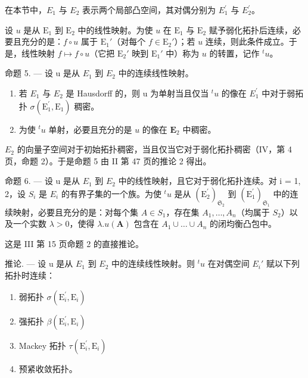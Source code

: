 在本节中，\(E_{1}\) 与 \(E_{2}\) 表示两个局部凸空间，其对偶分别为 \(E_{1}^{\prime}\) 与 \(E_{2}^{\prime}\)。

设 \(u\) 是从 \(\mathrm{E}_1\) 到 \(\mathrm{E}_2\) 中的线性映射。为使 \(u\) 在 \(\mathrm{E}_1\) 与 \(\mathrm{E}_2\) 赋予弱化拓扑后连续，必要且充分的是：\(f \circ u\) 属于 \(\mathrm{E}_1'\)（对每个 \(f \in \mathrm{E}_2'\)）；若 \(u\) 连续，则此条件成立。于是，线性映射 \(f \mapsto f \circ u\)（它把 \(\mathrm{E}_2'\) 映到 \(\mathrm{E}_1'\) 中）称为 \(u\) 的转置，记作 \(^t u\)。

命题 5. --- 设 u 是从 \(E_{1}\) 到 \(E_{2}\) 中的连续线性映射。

\begin{enumerate}
\def\labelenumi{(\roman{enumi})}
\item
  若 \(E_{1}\) 与 \(E_{2}\) 是 Hausdorff 的，则 u 为单射当且仅当 \(^{t}u\) 的像在 \(E_{1}^{\prime}\) 中对于弱拓扑 \(\sigma(\mathrm{E}_{1}^{\prime},\mathrm{E}_{1})\) 稠密。
\item
  为使 \({}^{t}u\) 单射，必要且充分的是 \(u\) 的像在 \(\mathbf{E}_2\) 中稠密。
\end{enumerate}

\(E_{2}\) 的向量子空间对于初始拓扑稠密，当且仅当它对于弱化拓扑稠密（IV，第 4 页，命题 2）。于是命题 5 由 II 第 47 页的推论 2 得出。

命题 6. --- 设 u 是从 \(E_{1}\) 到 \(E_{2}\) 中的线性映射，且它对于弱化拓扑连续。对 i = 1, 2，设 \(S_{i}\) 是 \(E_{i}\) 的有界子集的一个族。为使 \(^{t}u\) 是从 \((\mathrm{E}_{2}^{\prime})_{\mathfrak{S}_{2}}\) 到 \((\mathrm{E}_{1}^{\prime})_{\mathfrak{S}_{1}}\) 中的连续映射，必要且充分的是：对每个集 \(A \in S_{1}\)，存在集 \(A_{1}, \ldots, A_{n}\)（均属于 \(S_{2}\)）以及一个实数 \(\lambda > 0\)，使得 \(\lambda.u(\mathbf{A})\) 包含在 \(A_{1} \cup \ldots \cup A_{n}\) 的闭均衡凸包中。

这是 III 第 15 页命题 2 的直接推论。

推论. --- 设 u 是从 \(E_{1}\) 到 \(E_{2}\) 中的连续线性映射。则 \({}^t u\) 在对偶空间 \(E_{i}'\) 赋以下列拓扑时连续：

\begin{enumerate}
\def\labelenumi{\alph{enumi})}
\item
  弱拓扑 \(\sigma (\mathrm{E}_i^{\prime},\mathrm{E}_i)\)
\item
  强拓扑 \(\beta (\mathrm{E}_i^{\prime},\mathrm{E}_i)\)
\item
  Mackey 拓扑 \(\tau (\mathrm{E}_i^{\prime},\mathrm{E}_i)\)
\item
  预紧收敛拓扑。
\end{enumerate}

